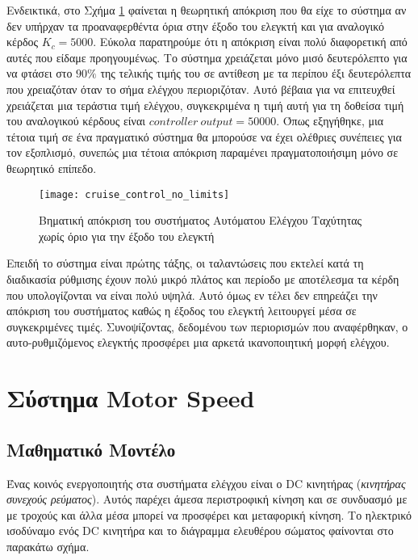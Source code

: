 Ενδεικτικά, στο Σχήμα \ref{fig:cruise_control_no_limits} φαίνεται η θεωρητική απόκριση που θα είχε το σύστημα αν δεν υπήρχαν τα προαναφερθέντα όρια στην έξοδο του ελεγκτή και για αναλογικό κέρδος $K_c = 5000$. Εύκολα παρατηρούμε ότι η απόκριση είναι πολύ διαφορετική από αυτές που είδαμε προηγουμένως. Το σύστημα χρειάζεται μόνο μισό δευτερόλεπτο για να φτάσει στο $90\%$ της τελικής τιμής του σε αντίθεση με τα περίπου έξι δευτερόλεπτα που χρειαζόταν όταν το σήμα ελέγχου περιοριζόταν. Αυτό βέβαια για να επιτευχθεί χρειάζεται μια τεράστια τιμή ελέγχου, συγκεκριμένα η τιμή αυτή για τη δοθείσα τιμή του αναλογικού κέρδους είναι $controller\ output = 50000$. Όπως εξηγήθηκε, μια τέτοια τιμή σε ένα πραγματικό σύστημα θα μπορούσε να έχει ολέθριες συνέπειες για τον εξοπλισμό, συνεπώς μια τέτοια απόκριση παραμένει πραγματοποιήσιμη μόνο σε θεωρητικό επίπεδο.

\begin{figure}[h]
  \centering
  \texttt{[image: cruise\_control\_no\_limits]}
  \caption{Βηματική απόκριση του συστήματος Αυτόματου Ελέγχου Ταχύτητας χωρίς όριο για την έξοδο του ελεγκτή}
  \label{fig:cruise_control_no_limits}
\end{figure}

Επειδή το σύστημα είναι πρώτης τάξης, οι ταλαντώσεις που εκτελεί κατά τη διαδικασία ρύθμισης έχουν πολύ μικρό πλάτος και περίοδο με αποτέλεσμα τα κέρδη που υπολογίζονται να είναι πολύ υψηλά. Αυτό όμως εν τέλει δεν επηρεάζει την απόκριση του συστήματος καθώς η έξοδος του ελεγκτή λειτουργεί μέσα σε συγκεκριμένες τιμές. Συνοψίζοντας, δεδομένου των περιορισμών που αναφέρθηκαν, ο αυτο-ρυθμιζόμενος ελεγκτής προσφέρει μια αρκετά ικανοποιητική μορφή ελέγχου.

\section{Σύστημα Motor Speed} \label{sec:motor_speed}

\subsection{Μαθηματικό Μοντέλο}

Ένας κοινός ενεργοποιητής στα συστήματα ελέγχου είναι ο DC κινητήρας (\emph{κινητήρας συνεχούς ρεύματος}). Αυτός παρέχει άμεσα περιστροφική κίνηση και σε συνδυασμό με με τροχούς και άλλα μέσα μπορεί να προσφέρει και μεταφορική κίνηση. Το ηλεκτρικό ισοδύναμο ενός  DC κινητήρα και το διάγραμμα ελευθέρου σώματος φαίνονται στο παρακάτω σχήμα. 

